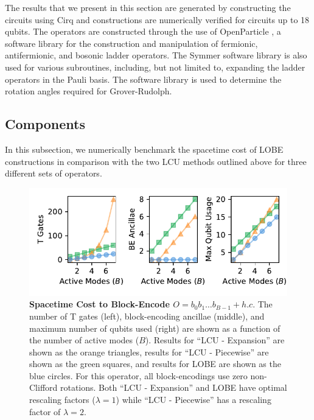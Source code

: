 The results that we present in this section are generated by constructing the circuits using Cirq \cite{cirq} and constructions are numerically verified for circuits up to 18 qubits.
The operators are constructed through the use of OpenParticle \cite{openparticle}, a software library for the construction and manipulation of fermionic, antifermionic, and bosonic ladder operators.
The Symmer software library \cite{} is also used for various subroutines, including, but not limited to, expanding the ladder operators in the Pauli basis.
The software library \cite{grover-rudolph-github} is used to determine the rotation angles required for Grover-Rudolph.

\subsection{Components}

In this subsection, we numerically benchmark the spacetime cost of LOBE constructions in comparison with the two LCU methods outlined above for three different sets of operators.

\begin{figure}
    \centering
    \includegraphics[width=12cm]{figures/fermionic-hc-comparison.pdf}
    \caption{
        \textbf{Spacetime Cost to Block-Encode $O = b_0 b_1 \hdots b_{B-1} + h.c.$}
        The number of T gates (left), block-encoding ancillae (middle), and maximum number of qubits used (right) are shown as a function of the number of active modes ($B$).
        Results for ``LCU - Expansion'' are shown as the orange triangles, results for ``LCU - Piecewise'' are shown as the green squares, and results for LOBE are shown as the blue circles.
        For this operator, all block-encodings use zero non-Clifford rotations.
        Both ``LCU - Expansion'' and LOBE have optimal rescaling factors ($\lambda = 1$) while ``LCU - Piecewise'' has a rescaling factor of $\lambda = 2$.
    }
    \label{fig:fermionic-hc-comparison}
\end{figure}

